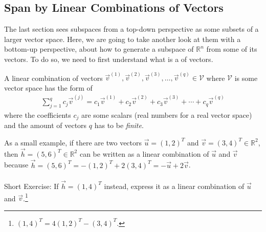 \subsection{Span by Linear Combinations of Vectors}
\label{section:span}
The last section sees subspaces from a top-down perspective as some subsets of a larger vector space. Here, we are going to take another look at them with a bottom-up perspective, about how to generate a subspace of $\mathbb{R}^n$ from some of its vectors. To do so, we need to first understand what is a  of vectors.
\begin{defn}
\label{defn:linearcomb}
A linear combination of vectors $\vec{v}^{(1)}, \vec{v}^{(2)}, \vec{v}^{(3)}, \ldots, \vec{v}^{(q)} \in \mathcal{V}$ where $\mathcal{V}$ is some vector space has the form of
\begin{align*}
\sum_{j=1}^q c_j\vec{v}^{(j)} = c_1\vec{v}^{(1)} + c_2\vec{v}^{(2)} + c_3\vec{v}^{(3)} + \cdots + c_q\vec{v}^{(q)}
\end{align*}
where the coefficients $c_j$ are some scalars (real numbers for a real vector space) and the amount of vectors $q$ has to be \textit{finite}.
\end{defn}
As a small example, if there are two vectors $\vec{u} = (1,2)^T$ and $\vec{v} = (3,4)^T \in \mathbb{R}^2$, then $\vec{h} = (5,6)^T \in \mathbb{R}^2$ can be written as a linear combination of $\vec{u}$ and $\vec{v}$ because $\vec{h} = (5,6)^T = -(1,2)^T + 2(3,4)^T = -\vec{u} + 2\vec{v}$. \\
\\
Short Exercise: If $\vec{h} = (1,4)^T$ instead, express it as a linear combination of $\vec{u}$ and $\vec{v}$.\footnote{$(1,4)^T = 4(1,2)^T - (3,4)^T$.}\par

